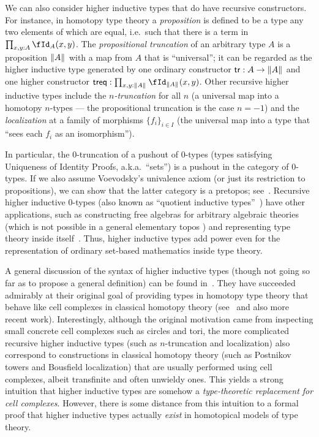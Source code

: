 \documentclass{amsart}
\def\tr{\mathsf{tr}}
\def\treq{\mathsf{treq}}
\begin{document}
We can also consider higher inductive types that do have recursive constructors.
For instance, in homotopy type theory a \emph{proposition} is defined to be a type any two elements of which are equal, i.e.\ such that there is a term in $\prod_{x,y:A} \id[A]xy$.
The \emph{propositional truncation} of an arbitrary type $A$ is a proposition $\mathopen{}\left\Vert A\right\Vert_{}\mathclose{}$ with a map from $A$ that is ``universal''; it can be regarded as the higher inductive type generated by one ordinary constructor $\tr:A\to\brck{A}$ and one higher constructor $\treq : \prod_{x,y:\brck{A}}\id[\brck{A}]{x}{y}$.
Other recursive higher inductive types include the \emph{$n$-truncation} for all $n$ (a universal map into a homotopy $n$-types --- the propositional truncation is the case $n=-1$) and the \emph{localization} at a family of morphisms $\{f_i\}_{i\in I}$ (the universal map into a type that ``sees each $f_i$ as an isomorphism'').

In particular, the $0$-truncation of a pushout of $0$-types (types satisfying Uniqueness of Identity Proofs, a.k.a.\ ``sets'') is a pushout in the category of $0$-types.
If we also assume Voevodsky's univalence axiom (or just its restriction to propositions), we can show that the latter category is a pretopos; see~\cite[Chapter 10]{hottbook}.
Recursive higher inductive $0$-types (also known as ``quotient inductive types''~\cite{acdf:qiits}) have other applications, such as constructing free algebras for arbitrary algebraic theories (which is not possible in a general elementary topos \cite{blass:freealg}) and representing type theory inside itself~\cite{ak:tt-qit}.
Thus, higher inductive types add power even for the representation of ordinary set-based mathematics inside type theory.

A general discussion of the syntax of higher inductive types (though not going so far as to propose a general definition) can be found in~\cite[Chapter 6]{hottbook}.
They have succeeded admirably at their original goal of providing types in homotopy type theory that behave like cell complexes in classical homotopy theory (see~\cite[Chapter 8]{hottbook} and also more recent work).
Interestingly, although the original motivation came from inspecting small concrete cell complexes such as circles and tori, the more complicated recursive higher inductive types (such as $n$-truncation and localization) also correspond to constructions in classical homotopy theory (such as Postnikov towers and Bousfield localization) that are usually performed using cell complexes, albeit transfinite and often unwieldy ones.
This yields a strong intuition that higher inductive types are somehow a \emph{type-theoretic replacement for cell complexes}.
However, there is some distance from this intuition to a formal proof that higher inductive types actually \emph{exist} in homotopical models of type theory.
\end{document}

